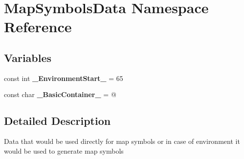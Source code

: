 \hypertarget{namespace_map_symbols_data}{}\section{Map\+Symbols\+Data Namespace Reference}
\label{namespace_map_symbols_data}
\subsection*{Variables}
\begin{DoxyCompactItemize}
\item 
\hypertarget{namespace_map_symbols_data_a05f9ea588b6fba356454972c587c7620}{}\label{namespace_map_symbols_data_a05f9ea588b6fba356454972c587c7620} 
const int {\bfseries \+\_\+\+Environment\+Start\+\_\+} = 65
\item 
\hypertarget{namespace_map_symbols_data_a3019a34c15fe9301da37d5971a2d6e9f}{}\label{namespace_map_symbols_data_a3019a34c15fe9301da37d5971a2d6e9f} 
const char {\bfseries \+\_\+\+Basic\+Container\+\_\+} = \textquotesingle{}@\textquotesingle{}
\end{DoxyCompactItemize}


\subsection{Detailed Description}
Data that would be used directly for map symbols or in case of environment it would be used to generate map symbols 